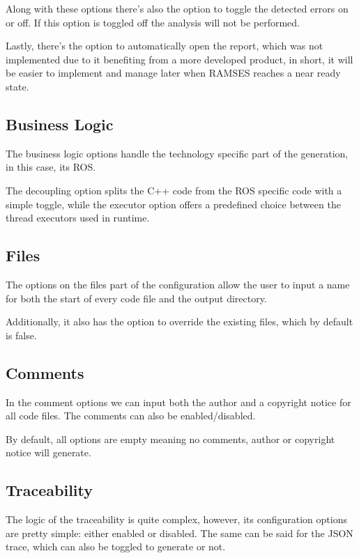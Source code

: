 Along with these options there's also the option to toggle the detected errors on or off. If this option is toggled off the analysis will not be performed.

Lastly, there's the option to automatically open the report, which was not implemented due to it benefiting from a more developed product, in short, it will be easier to implement and manage later when \gls{RAMSES} reaches a near ready state.


\subsection{Business Logic}
\label{sec:dsl_business_logic}

The business logic options handle the technology specific part of the generation, in this case, its \gls{ROS}. 

The decoupling option splits the C++ code from the \gls{ROS} specific code with a simple toggle, while the executor option offers a predefined choice between the thread executors used in runtime.


\subsection{Files}
\label{sec:dsl_files}

The options on the files part of the configuration allow the user to input a name for both the start of every code file and the output directory.

Additionally, it also has the option to override the existing files, which by default is false.



\subsection{Comments}
\label{sec:dsl_comments}

In the comment options we can input both the author and a copyright notice for all code files. The comments can also be enabled/disabled. 

By default, all options are empty meaning no comments, author or copyright notice will generate.



\subsection{Traceability}
\label{sec:dsl_trace}

The logic of the traceability is quite complex, however, its configuration options are pretty simple: either enabled or disabled. The same can be said for the \gls{JSON} trace, which can also be toggled to generate or not.


